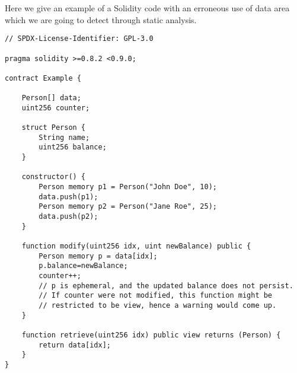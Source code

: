 \documentclass{article}
\begin{document}
Here we give an example of a Solidity code with an erroneous use of data area which we are going to detect through static analysis.
\begin{verbatim}
// SPDX-License-Identifier: GPL-3.0

pragma solidity >=0.8.2 <0.9.0;

contract Example {

    Person[] data;
    uint256 counter;

    struct Person {
        String name;
        uint256 balance;
    }

    constructor() {
        Person memory p1 = Person("John Doe", 10);
        data.push(p1);
        Person memory p2 = Person("Jane Roe", 25);
        data.push(p2);
    }

    function modify(uint256 idx, uint newBalance) public {
        Person memory p = data[idx];
        p.balance=newBalance;
        counter++;
        // p is ephemeral, and the updated balance does not persist.
        // If counter were not modified, this function might be
        // restricted to be view, hence a warning would come up.
    }

    function retrieve(uint256 idx) public view returns (Person) {
        return data[idx];
    }
}
\end{verbatim}
\end{document}
